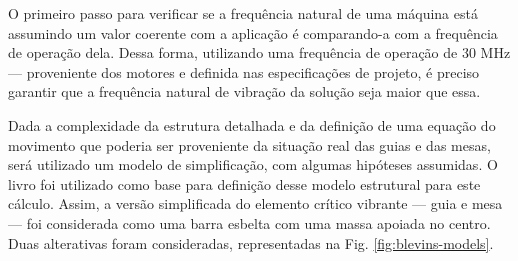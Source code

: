 O primeiro passo para verificar se a frequência natural de uma máquina está assumindo um valor coerente com a aplicação é comparando-a com a frequência de operação dela. Dessa forma, utilizando uma frequência de operação de 30 MHz --- proveniente dos motores e definida nas especificações de projeto, é preciso garantir que a frequência natural de vibração da solução seja maior que essa. 


Dada a complexidade da estrutura detalhada e da definição de uma equação do movimento que poderia ser proveniente da situação real das guias e das mesas, será utilizado um modelo de simplificação, com algumas hipóteses assumidas. O livro \cite{blevins2001formulas} foi utilizado como base para definição desse modelo estrutural para este cálculo. Assim, a versão simplificada do elemento crítico vibrante --- guia e mesa --- foi considerada como uma barra esbelta com uma massa apoiada no centro. Duas alterativas foram consideradas, representadas na Fig. \ref{fig:blevins-models}.

